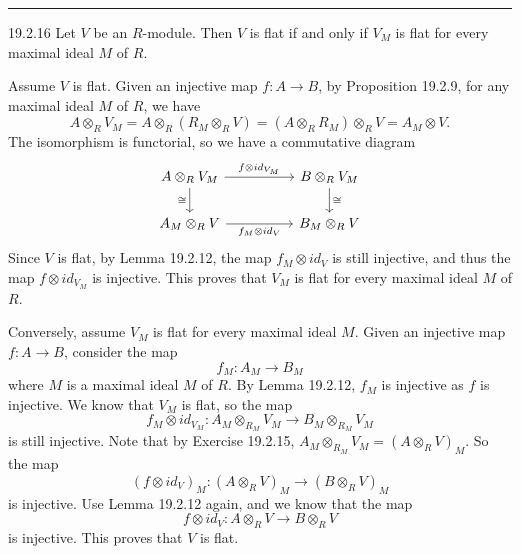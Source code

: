 \documentclass[a4paper, 12pt]{article}
\begin{document}
\noindent\rule{7in}{2.8pt}
\begin{problem}{19.2.16}
Let \(V\) be an \(R\)-module. Then \(V\) is flat if and only if \(V_M\) is flat for every maximal ideal \(M\) of \(R\).
\end{problem}
\begin{solution}
Assume \(V\) is flat. Given an injective map \(f:A\rightarrow B\), by Proposition 19.2.9, for any maximal ideal \(M\) of \(R\), we have 
\[A\otimes_R V_M=A\otimes_R (R_M\otimes_R V)=(A\otimes_R R_M)\otimes_R V=A_M\otimes V.\]
The isomorphism is functorial, so we have a commutative diagram 
\[\begin{tikzcd}
	{A\otimes_RV_M} && {B\otimes_RV_M} \\
	{A_M\otimes_R V} && {B_M\otimes_RV}
	\arrow["{f\otimes id_{V_M}}", from=1-1, to=1-3]
	\arrow["\cong"', from=1-1, to=2-1]
	\arrow["\cong", from=1-3, to=2-3]
	\arrow["{f_M\otimes id_V}"', from=2-1, to=2-3]
\end{tikzcd}\]
Since \(V\) is flat, by Lemma 19.2.12, the map \(f_M\otimes id_V\) is still injective, and thus the map \(f\otimes id_{V_M}\) is injective. This proves that \(V_M\) is flat for every maximal ideal \(M\) of \(R\).

Conversely, assume \(V_M\) is flat for every maximal ideal \(M\). Given an injective map \(f:A\rightarrow B\), consider the map 
\[f_M:A_M\rightarrow B_M\]
where \(M\) is a maximal ideal \(M\) of \(R\). By Lemma 19.2.12, \(f_M\) is injective as \(f\) is injective. We know that \(V_M\) is flat, so the map 
\[f_M\otimes id_{V_M}:A_M\otimes_{R_M} V_M\rightarrow B_M\otimes_{R_M}V_M\]
is still injective. Note that by Exercise 19.2.15, \(A_M\otimes_{R_M}V_M=(A\otimes_R V)_M\). So the map 
\[(f\otimes id_V)_M:(A\otimes_R V)_M\rightarrow (B\otimes_R V)_M\]
is injective. Use Lemma 19.2.12 again, and we know that the map 
\[f\otimes id_V:A\otimes_R V\rightarrow B\otimes_R V\]
is injective. This proves that \(V\) is flat.
\end{solution}
\end{document}
